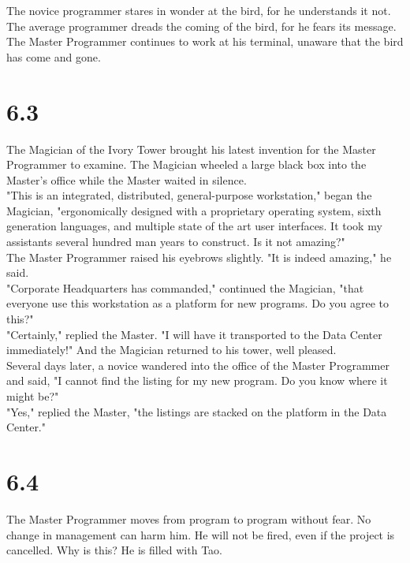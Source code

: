 \documentclass[14pt, letterpaper]{book}
\begin{document}
The novice programmer stares in wonder at the bird, for he understands it not. The average programmer dreads the coming of the bird, for he fears its message. The Master Programmer continues to work at his terminal, unaware that the bird has come and gone.

\section*{6.3}
The Magician of the Ivory Tower brought his latest invention for the Master Programmer to examine. The Magician wheeled a large black box into the Master's office while the Master waited in silence.\\

"This is an integrated, distributed, general-purpose workstation," began the Magician, "ergonomically designed with a proprietary operating system, sixth generation languages, and multiple state of the art user interfaces. It took my assistants several hundred man years to construct. Is it not amazing?"\\

The Master Programmer raised his eyebrows slightly. "It is indeed amazing," he said.\\

"Corporate Headquarters has commanded," continued the Magician, "that everyone use this workstation as a platform for new programs. Do you agree to this?"\\

"Certainly," replied the Master. "I will have it transported to the Data Center immediately!" And the Magician returned to his tower, well pleased.\\

Several days later, a novice wandered into the office of the Master Programmer and said, "I cannot find the listing for my new program. Do you know where it might be?"\\

"Yes," replied the Master, "the listings are stacked on the platform in the Data Center."\\

\section*{6.4}
The Master Programmer moves from program to program without fear. No change in management can harm him. He will not be fired, even if the project is cancelled. Why is this? He is filled with Tao.
\end{document}

